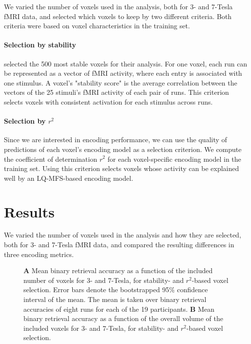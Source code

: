 We varied the number of voxels used in the analysis, both for 3- and 7-Tesla f{MRI} data,
and selected which voxels to keep by two different criteria. Both criteria were
based on voxel characteristics in the training set.  

\paragraph{Selection by stability}

\citet{ML08} selected the 500 most stable voxels for their analysis. For one
voxel, each run can be represented as a vector of f{MRI} activity, where each
entry is associated with one stimulus. A voxel's "stability score" is the average correlation between the vectors of the 25 stimuli's f{MRI} activity of each pair of runs.
This criterion selects voxels with consistent activation for each stimulus across runs.

\paragraph{Selection by $r^2$}

Since we are interested in encoding performance, we can use the quality of
predictions of each voxel's encoding model as a selection criterion. We compute
the coefficient of determination $r^2$ for each voxel-specific encoding model in
the training set. Using this criterion selects voxels whose activity can be explained well
by an LQ-MFS-based encoding model.

\section*{Results}

We varied the number of voxels used in the analysis and how they are selected,
both for 3- and 7-Tesla f{MRI} data, and compared the resulting differences in
three encoding metrics.

\begin{figure}
  \centering
  \def\svgwidth{\linewidth}
  
	
  \caption{\textbf{A} Mean binary retrieval accuracy as a function of the included number of
  voxels for 3- and 7-Tesla, for stability- and $r^2$-based voxel selection. Error bars denote the bootstrapped 95\% confidence
  interval of the mean. The mean is taken over binary retrieval accuracies of
  eight runs for each of the 19 participants. \textbf{B} Mean binary retrieval accuracy as a function of the overall volume of
	  the included voxels for 3- and 7-Tesla, for stability- and $r^2$-based voxel selection.}

 \label{fig:binary_retrieval}
\end{figure}

